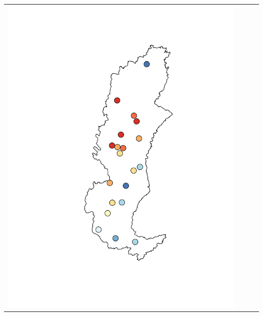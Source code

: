 \begin{landscape}
\begin{tabular}{c c c l}
				\includegraphics[trim= 4cm 2cm 1cm 2cm, clip, scale = 0.35]{./img/nashsut_priestley} &

\end{tabular}
\end{landscape}
